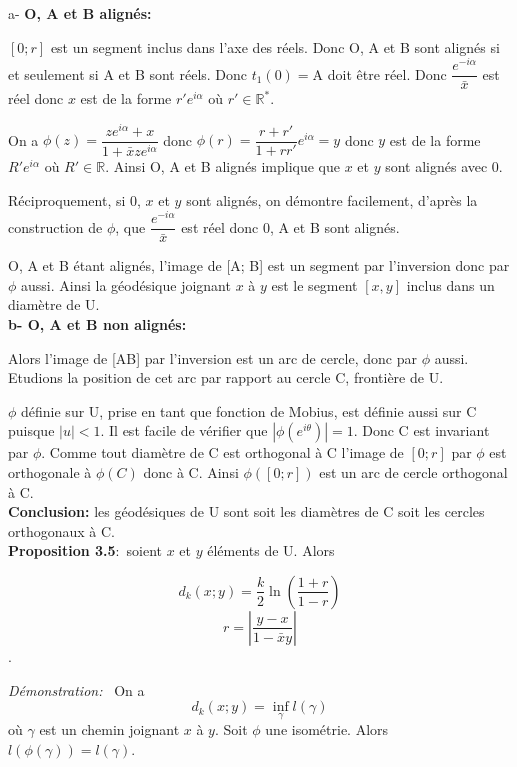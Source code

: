 \documentclass[a4paper, 12pt, twoside]{book}
\begin{document}
  
 a- \textbf{O, A et B alignés:}\
  
  $[0; r]$ est un segment inclus dans l'axe des réels. Donc O, A et B sont alignés si et seulement si A et B sont réels. Donc $t_{1}(0)=$A doit être réel. Donc $\dfrac{e^{-i\alpha}}{\bar{x}}$ est réel donc $x$ est de la forme $r'e^{i\alpha}$ où $r'\in \mathbb{R^{*}}$.
  
  On a $\phi(z)=\dfrac{ze^{i\alpha}+x}{1+\bar{x}ze^{i\alpha}}$ donc $\phi(r)=\dfrac{r+r'}{1+rr'}e^{i\alpha}=y$ donc $y$ est de la forme $R'e^{i\alpha}$ où $R'\in \mathbb{R}$. Ainsi O, A et B alignés implique que  $x$ et $y$ sont alignés avec 0.\
  
  Réciproquement, si 0, $x$ et $y$ sont alignés, on démontre facilement, d'après la construction de $\phi$, que  $\dfrac{e^{-i\alpha}}{\bar{x}}$ est réel donc 0, A et B sont alignés.\
  
  O, A et B étant alignés, l'image de [A; B] est un segment par l'inversion donc par $\phi$ aussi. Ainsi la géodésique joignant $x$ à $y$ est le segment $[x, y]$ inclus dans un diamètre de U.\\
  
  
  \textbf{b- O, A et B non alignés:}\
  
  Alors l'image de [AB] par l'inversion est un arc de cercle, donc par $\phi$ aussi. Etudions la position de cet arc par rapport au cercle C, frontière de U. \
  
  
 $\phi$ définie sur U, prise en tant que fonction de Mobius, est définie aussi sur C puisque $|u|<1$. Il est facile de vérifier que $|\phi(e^{i\theta})|=1$. Donc C est invariant par $\phi$. Comme tout diamètre de C est orthogonal à C l'image de $[0; r]$ par $\phi$ est orthogonale à    $\phi(C)$ donc à C. Ainsi $\phi([0; r])$ est un arc de cercle orthogonal à C.\\
 
 \textbf{Conclusion:} les géodésiques de U sont soit les diamètres de C soit les cercles orthogonaux à C.\\
 
    

   
\textbf{Proposition 3.5}:\
soient $x$ et $y$ éléments de U. Alors\

$$d_{k}(x;y)=\dfrac{k}{2}\ln(\dfrac{1+r}{1-r})$$  $$r=|\dfrac{y-x}{1-\bar{x}y}|$$.  
  
   
 \textit{Démonstration:} \
  On a $$d_{k}(x; y)=\inf_{\gamma}l(\gamma)$$ où $\gamma$ est un chemin joignant $x$ à $y$. Soit $\phi$ une isométrie. Alors $l(\phi(\gamma))=l(\gamma)$.\
  
\end{document}
